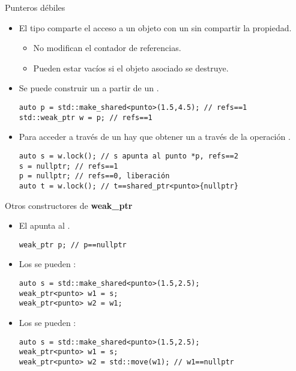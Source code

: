 \begin{frame}[t,fragile]{Punteros débiles}
\begin{itemize}
  \item El tipo  comparte el acceso a un objeto con un
         sin compartir la propiedad.
    \begin{itemize}
      \item No modifican el contador de referencias.
      \item Pueden estar vacíos si el objeto asociado se destruye.
    \end{itemize}

  \item Se puede construir un  a partir de un .
\begin{lstlisting}
auto p = std::make_shared<punto>(1.5,4.5); // refs==1
std::weak_ptr w = p; // refs==1
\end{lstlisting}

  \item Para acceder a través de un  hay que obtener un
         a través de la operación .
\begin{lstlisting}
auto s = w.lock(); // s apunta al punto *p, refs==2
s = nullptr; // refs==1
p = nullptr; // refs==0, liberación
auto t = w.lock(); // t==shared_ptr<punto>{nullptr}
\end{lstlisting}
  
\end{itemize}
\end{frame}

\begin{frame}[t,fragile]{Otros constructores de \textbf{weak\_ptr}}
\begin{itemize}
  \item El  apunta al .
\begin{lstlisting}
weak_ptr p; // p==nullptr
\end{lstlisting}

  \item Los  se pueden :
\begin{lstlisting}
auto s = std::make_shared<punto>(1.5,2.5);
weak_ptr<punto> w1 = s;
weak_ptr<punto> w2 = w1;
\end{lstlisting}

  \item Los  se pueden :
\begin{lstlisting}
auto s = std::make_shared<punto>(1.5,2.5);
weak_ptr<punto> w1 = s;
weak_ptr<punto> w2 = std::move(w1); // w1==nullptr
\end{lstlisting}
\end{itemize} 
\end{frame}

